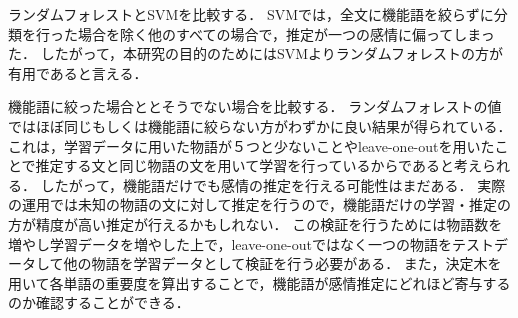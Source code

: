 ランダムフォレストとSVMを比較する．
SVMでは，全文に機能語を絞らずに分類を行った場合を除く他のすべての場合で，推定が一つの感情に偏ってしまった．
したがって，本研究の目的のためにはSVMよりランダムフォレストの方が有用であると言える．

機能語に絞った場合ととそうでない場合を比較する．
ランダムフォレストの値ではほぼ同じもしくは機能語に絞らない方がわずかに良い結果が得られている．
これは，学習データに用いた物語が５つと少ないことやleave-one-outを用いたことで推定する文と同じ物語の文を用いて学習を行っているからであると考えられる．
したがって，機能語だけでも感情の推定を行える可能性はまだある．
実際の運用では未知の物語の文に対して推定を行うので，機能語だけの学習・推定の方が精度が高い推定が行えるかもしれない．
この検証を行うためには物語数を増やし学習データを増やした上で，leave-one-outではなく一つの物語をテストデータして他の物語を学習データとして検証を行う必要がある．
また，決定木を用いて各単語の重要度を算出することで，機能語が感情推定にどれほど寄与するのか確認することができる．

